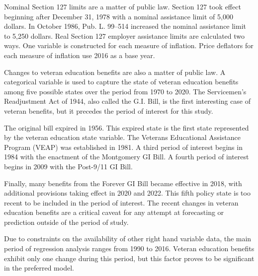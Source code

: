\documentclass[review]{elsarticle}
\begin{document}
    Nominal Section 127 limits are a matter of public law.
    Section 127 took effect beginning after December 31, 1978 with a nominal assistance limit of 5,000 dollars\cite{plaw95_600_1978}.
    In October 1986, Pub. L. 99–514 increased the nominal assistance limit to 5,250 dollars\cite{plaw99_514_1986}.
    Real Section 127 employer assistance limits are calculated two ways.
    One variable is constructed for each measure of inflation.
    Price deflators for each measure of inflation use 2016 as a base year.
    
    Changes to veteran education benefits are also a matter of public law.
    A categorical variable is used to capture the state of veteran education benefits among five possible states over the period from 1970 to 2020.
    The Servicemen's Readjustment Act of 1944,
    also called the G.I. Bill,
    is the first interesting case of veteran benefits,
    but it precedes the period of interest for this study.

    The original bill expired in 1956\cite{glass_2010}.
    This expired state is the first state represented by the veteran education state variable.
    The Veterans Educational Assistance Program (VEAP) was established in 1981\cite{veteransaffairs_2017}.
    A third period of interest begins in 1984 with the enactment of the Montgomery GI Bill\cite{powers_2018}.
    A fourth period of interest begins in 2009 with the Post-9/11 GI Bill.

    Finally, many benefits from the Forever GI Bill became effective in 2018,
    with additional provisions taking effect in 2020 and 2022\cite{veteransaffairs_2020}.
    This fifth policy state is too recent to be included in the period of interest.
    The recent changes in veteran education benefits are a critical caveat for any attempt at forecasting or prediction outside of the period of study.

    Due to constraints on the availability of other right hand variable data,
    the main period of regression analysis ranges from 1990 to 2016.
    Veteran education benefits exhibit only one change during this period,
    but this factor proves to be significant in the preferred model.
\end{document}
